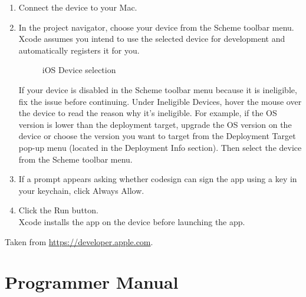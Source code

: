\begin{enumerate}
\item Connect the device to your Mac.
\item In the project navigator, choose your device from the Scheme toolbar menu.\\ Xcode assumes you intend to use the selected device for development and automatically registers it for you.\\

	\begin{figure}[tbh]
	\begin{center}
	\end{center}
	\caption{iOS Device selection \label{iOSDeviceSelection}}
	\end{figure}
	
 If your device is disabled in the Scheme toolbar menu because it is ineligible, fix the issue before continuing. Under Ineligible Devices, hover the mouse over the device to read the reason why it’s ineligible. For example, if the OS version is lower than the deployment target, upgrade the OS version on the device or choose the version you want to target from the Deployment Target pop-up menu (located in the Deployment Info section). Then select the device from the Scheme toolbar menu.
\item If a prompt appears asking whether codesign can sign the app using a key in your keychain, click Always Allow.
\item Click the Run button.\\

Xcode installs the app on the device before launching the app.
\end{enumerate}

Taken from \href{https://developer.apple.com/library/mac/documentation/IDEs/Conceptual/AppDistributionGuide/LaunchingYourApponDevices/LaunchingYourApponDevices.html}{https://developer.apple.com}. 


\section{Programmer Manual}

